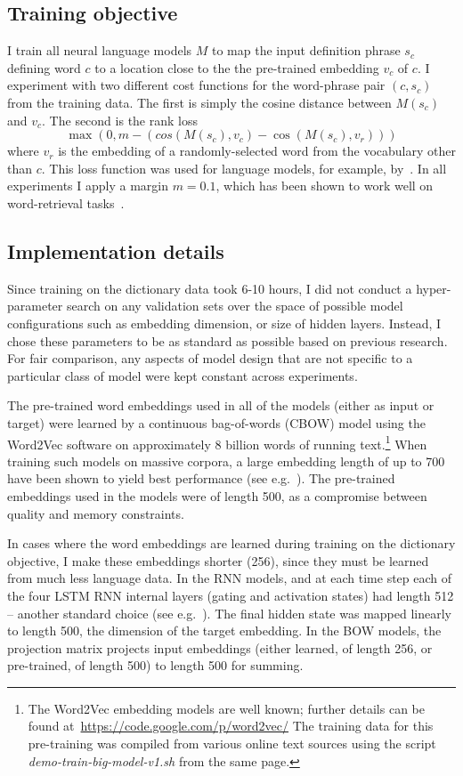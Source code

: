 \subsection{Training objective}

I train all neural language models \(M\) to map the input definition phrase \(s_c\) defining word \(c\) to a location close to the the pre-trained embedding \(v_c\) of \(c\). I experiment with two different cost functions for the word-phrase pair \((c,s_c)\) from the training data. The first is simply the cosine distance between \(M(s_c)\) and \(v_c\). The second is the rank loss 
\[
\max(0, m - (cos(M(s_c),v_c)-\cos(M(s_c),v_r)))
\] 
where \(v_r\) is the embedding of a randomly-selected word from the vocabulary other than \(c\). This loss function was used for language models, for example, by~\cite{huang2012improving}. In all experiments I apply a margin \(m = 0.1\), which has been shown to work well on word-retrieval tasks~\citep{bordes2015large}. 

\subsection{Implementation details}
Since training on the dictionary data took 6-10 hours, I did not conduct a hyper-parameter search on any validation sets over the space of possible model configurations such as embedding dimension, or size of hidden layers. Instead, I chose these parameters to be as standard as possible based on previous research. For fair comparison, any aspects of model design that are not specific to a particular class of model were kept constant across experiments. 

The pre-trained word embeddings used in all of the models (either as input or target) were learned by a continuous bag-of-words (CBOW) model using the Word2Vec software on approximately 8 billion words of running text.\footnote{The Word2Vec embedding models are well known; further details can be found at~\url{https://code.google.com/p/word2vec/} The training data for this pre-training was compiled from various online text sources using the script \emph{demo-train-big-model-v1.sh} from the same page.} When training such models on massive corpora, a large embedding length of up to 700 have been shown to yield best performance (see e.g.~\citep{faruqui2014retrofitting}). The pre-trained embeddings used in the models were of length 500, as a compromise between quality and memory constraints.

In cases where the word embeddings are learned during training on the dictionary objective, I make these embeddings shorter (256), since they must be learned from much less language data. In the RNN models, and at each time step each of the four LSTM RNN internal layers (gating and activation states) had length 512 -- another standard choice (see e.g.~\citep{cho2014learning}). The final hidden state was mapped linearly to length 500, the dimension of the target embedding. In the BOW models, the projection matrix projects input embeddings (either learned, of length 256, or pre-trained, of length 500) to length 500 for summing. 

